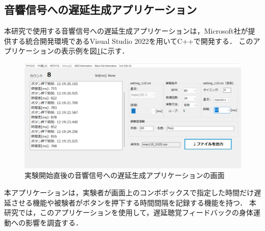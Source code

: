 \subsection{音響信号への遅延生成アプリケーション}
本研究で使用する音響信号への遅延生成アプリケーションは，Microsoft社が提供する統合開発環境であるVisual Studio 2022を用いてC++で開発する．
このアプリケーションの表示例を図\ref{fig:app_kyakkann}に示す．
\begin{figure}[tbp]
  \centering
  \includegraphics[scale=0.22]{figures/Apprication/App_kyakkann.pdf}
  \caption{実験開始直後の音響信号への遅延生成アプリケーションの画面}
  \label{fig:app_kyakkann}
\end{figure}
本アプリケーションは，実験者が画面上のコンボボックスで指定した時間だけ遅延させる機能や被験者がボタンを押下する時間間隔を記録する機能を持つ．
本研究では，このアプリケーションを使用して，遅延聴覚フィードバックの身体運動への影響を調査する．